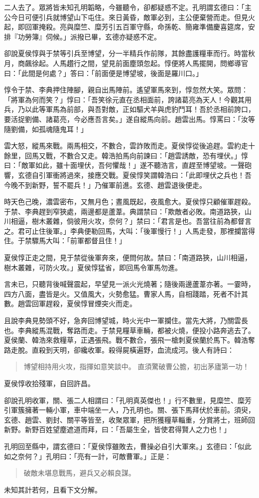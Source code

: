 二人去了。眾將皆未知孔明韜略，今雖聽令，卻都疑惑不定。孔明謂玄德曰：「主公今日可便引兵就博望山下屯住。來日黃昏，敵軍必到，主公便棄營而走。但見火起，即回軍掩殺。亮與糜竺、糜芳引五百軍守縣，命孫乾、簡雍準備慶喜筵席，安排『功勞簿』伺候。」派撥已畢，玄德亦疑惑不定。

卻說夏侯惇與于禁等引兵至博望，分一半精兵作前隊，其餘盡護糧車而行。時當秋月，商飆徐起。人馬趲行之間，望見前面塵頭忽起。惇便將人馬擺開，問鄉導官曰：「此間是何處？」答曰：「前面便是博望坡，後面是羅川口。」

惇令于禁、李典押住陣腳，親自出馬陣前。遙望軍馬來到，惇忽然大笑。眾問：「將軍為何而笑？」惇曰：「吾笑徐元直在丞相面前，誇諸葛亮為天人！今觀其用兵，乃以此等軍馬為前部，與吾對敵，正如驅犬羊與虎豹鬥耳！吾於丞相前誇口，要活捉劉備、諸葛亮，今必應吾言矣。」遂自縱馬向前。趙雲出馬。惇罵曰：「汝等隨劉備，如孤魂隨鬼耳！」

雲大怒，縱馬來戰。兩馬相交，不數合，雲詐敗而走。夏侯惇從後追趕。雲約走十餘里，回馬又戰，不數合又走。韓浩拍馬向前諫曰：「趙雲誘敵，恐有埋伏。」惇曰：「敵軍如此，雖十面埋伏，吾何懼哉！」遂不聽浩言，直趕至博望坡。一聲砲響，玄德自引軍衝將過來，接應交戰。夏侯惇笑謂韓浩曰：「此即埋伏之兵也！吾今晚不到新野，誓不罷兵！」乃催軍前進。玄德、趙雲退後便走。

時天色己晚，濃雲密布，又無月色；晝風既起，夜風愈大。夏侯惇只顧催軍趕殺。于禁、李典趕到窄狹處，兩邊都是蘆葦。典謂禁曰：「欺敵者必敗。南道路狹，山川相逼，樹木叢雜，倘彼用火攻，奈何？」禁曰：「君言是也。吾當往前為都督言之。君可止住後軍。」李典便勒回馬，大叫：「後軍慢行！」人馬走發，那裡攔當得住。于禁驟馬大叫：「前軍都督且住！」

夏侯惇正走之間，見于禁從後軍奔來，便問何故。禁曰：「南道路狹，山川相逼，樹木叢雜，可防火攻。」夏侯惇猛省，即回馬令軍馬勿進。

言未已，只聽背後喊聲震起，早望見一派火光燒著；隨後兩邊蘆葦亦著。一霎時，四方八面，盡皆是火。又值風大，火勢愈猛。曹家人馬，自相踐踏，死者不計其數。趙雲回軍趕殺，夏侯惇冒煙突火而走。

且說李典見勢頭不好，急奔回博望城，時火光中一軍攔住。當先大將，乃關雲長也。李典縱馬混戰，奪路而走。于禁見糧草車輛，都被火燒，便投小路奔逃去了。夏侯蘭、韓浩來救糧草，正遇張飛。戰不數合，張飛一槍刺夏侯蘭於馬下。韓浩奪路走脫。直殺到天明，卻纔收軍。殺得屍橫遍野，血流成河。後人有詩曰：

\begin{quote}
博望相持用火攻，指揮如意笑談中。
直須驚破曹公膽，初出茅廬第一功！
\end{quote}

夏侯惇收拾殘軍，自回許昌。

卻說孔明收軍，關、張二人相謂曰：「孔明真英傑也！」行不數里，見糜竺、糜芳引軍簇擁著一輛小軍，車中端坐一人，乃孔明也。關、張下馬拜伏於車前。須臾，玄德、趙雲、劉封、關平等皆至，收聚眾軍，把所獲糧草輜重，分賞將士，班師回新野。新野百姓望塵遮道而拜，曰：「吾屬生全，皆使君得賢人之力也！」

孔明回至縣中，謂玄德曰：「夏侯惇雖敗去，曹操必自引大軍來。」玄德曰：「似此如之奈何？」孔明曰：「亮有一計，可敵曹軍。」正是：

\begin{quote}
破敵未堪息戰馬，避兵又必賴良謀。
\end{quote}

未知其計若何，且看下文分解。
